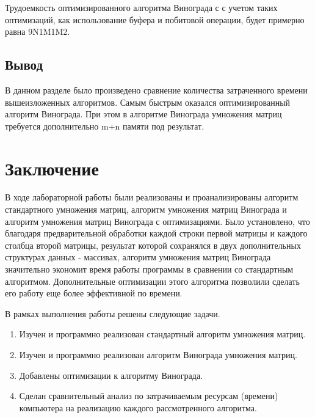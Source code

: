 \documentclass[12pt]{report}
\begin{document}
Трудоемкость оптимизированного алгоритма Винограда с с учетом таких оптимизаций, как использование буфера и побитовой операции, будет примерно равна 9N1M1M2.



\section{Вывод}

В данном разделе было произведено сравнение количества затраченного вре­мени вышеизложенных алгоритмов.
Самым быстрым оказался оптимизированный алгоритм Винограда.
При этом в алгоритме Винограда умножения матриц требуется дополнительно m+n памяти под результат.

\chapter*{Заключение}
В ходе лабораторной работы были реализованы и проанализированы алгоритм стандартного умножения матриц, алгоритм умножения матриц Винограда и алгоритм умножения матриц Винограда с оптимизациями. Было установлено, что благодаря предварительной обработки каждой строки первой матрицы и каждого столбца второй матрицы, результат которой сохранялся в двух дополнительных структурах данных - массивах, алгоритм умножения матриц Винограда значительно экономит время работы программы в сравнении со стандартным алгоритмом. Дополнительные оптимизации этого алгоритма позволили сделать его работу еще более эффективной по времени.

В рамках выполнения работы решены следующие задачи.

\begin{enumerate}
	\item Изучен и программно реализован стандартный алгоритм умножения матриц.
	\item Изучен и программно реализован алгоритм Винограда умножения матриц.
	\item Добавлены оптимизации к алгоритму Винограда.
	\item Сделан сравнительный анализ по затрачиваемым ресурсам (времени) компьютера на реализацию каждого рассмотренного алгоритма.

\end{enumerate}



\end{document}
